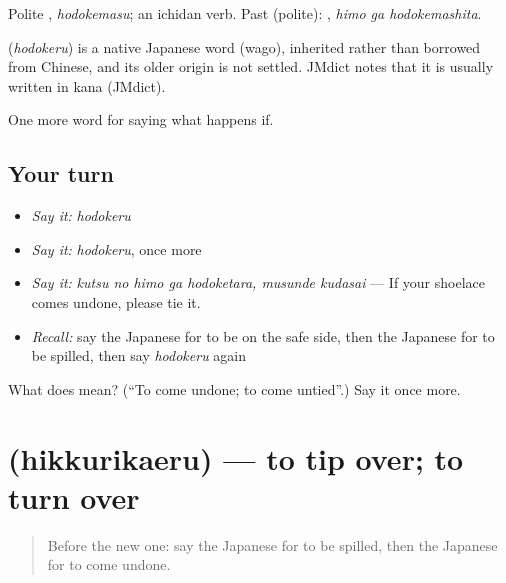 Polite \textbf{}, \emph{hodokemasu}; an ichidan verb. Past (polite): \textbf{ }, \emph{himo ga hodokemashita}.

\begin{cousinweb}
\textbf{} (\emph{hodokeru}) is a native Japanese word (wago), inherited rather than borrowed from Chinese, and its older origin is not settled. JMdict notes that it is usually written in kana (JMdict).
\end{cousinweb}

\begin{grammarlens}[title={What you've built}]
One more word for saying what happens if.
\end{grammarlens}

\subsection*{Your turn}
\begin{itemize}
\raggedright
  \item \emph{Say it:} \emph{hodokeru}
  \item \emph{Say it:} \emph{hodokeru}, once more
  \item \emph{Say it:} \emph{kutsu no himo ga hodoketara, musunde kudasai} — If your shoelace comes undone, please tie it.
  \item \emph{Recall:} say the Japanese for to be on the safe side, then the Japanese for to be spilled, then say \emph{hodokeru} again
\end{itemize}

\begin{tcolorbox}[breakable,colback=teal!4,colframe=teal!35!black,title={Before you move on}]
What does  mean? (\textquotedblleft{}To come undone; to come untied\textquotedblright{}.) Say it once more.
\end{tcolorbox}
\section[\texorpdfstring{\ja{ひっくりかえる} (hikkurikaeru)}{ひっくりかえる (hikkurikaeru)}]{ (hikkurikaeru) — to tip over; to turn over}

\label{lesson:JA-C352-hikkurikaeru}



\begin{quote}
Before the new one: say the Japanese for to be spilled, then the Japanese for to come undone.
\end{quote}

